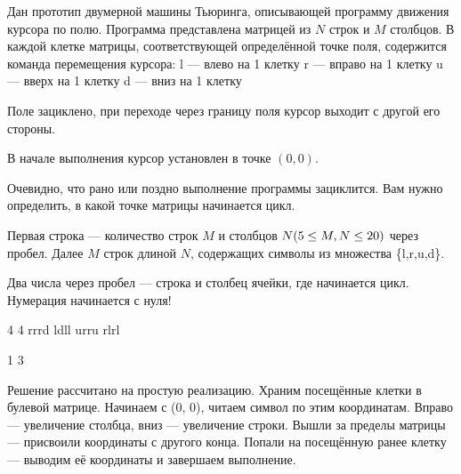 
Дан прототип двумерной машины Тьюринга, описывающей программу движения курсора по полю. Программа представлена матрицей из $N$ строк и $M$ столбцов. В каждой клетке матрицы, соответствующей определённой точке поля, содержится команда перемещения курсора:
l — влево на 1 клетку
r — вправо на 1 клетку
u — вверх на 1 клетку
d — вниз на 1 клетку

Поле зациклено, при переходе через границу поля курсор выходит с другой его стороны.

В начале выполнения курсор установлен в точке $(0,0)$.

Очевидно, что рано или поздно выполнение программы зациклится. Вам нужно определить, в какой точке матрицы начинается цикл.


Первая строка — количество строк $M$  и столбцов $N\space (5\leq M,N\leq 20)$ через пробел. 
Далее $M$ строк длиной $N$, содержащих символы из множества \{l,r,u,d\}.

\outputfmtSection

Два числа через пробел — строка и столбец ячейки, где начинается цикл. Нумерация начинается с нуля!


\begin{myverbbox}[\small]{\vinput}
    4 4
    rrrd
    ldll
    urru
    rlrl
\end{myverbbox}
\begin{myverbbox}[\small]{\voutput}
    1 3
\end{myverbbox}

\solutionSection

Решение рассчитано на простую реализацию. Храним посещённые клетки в булевой матрице. Начинаем с (0, 0), читаем символ по этим координатам. Вправо — увеличение столбца, вниз — увеличение строки. Вышли за пределы матрицы — присвоили координаты с другого конца. Попали на посещённую ранее клетку — выводим её координаты и завершаем выполнение.

